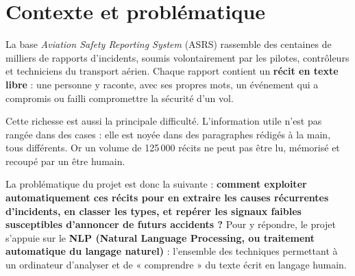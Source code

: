 \documentclass[11pt,a4paper]{article}
\begin{document}
\thispagestyle{empty}
\vspace*{2cm}
\begin{abstract}
\noindent Le présent rapport documente un projet de \textbf{traitement automatique du
langage naturel} appliqué à 125\,763 rapports d'incidents de la base \emph{Aviation Safety
Reporting System} (ASRS) de la NASA. Son objectif est de transformer une grande quantité de
récits écrits en texte libre en informations claires et exploitables pour la sécurité
aérienne. La démarche enchaîne cinq grandes étapes : nettoyer les textes, les convertir en
nombres, les regrouper par thème, identifier les sujets dominants, et enfin prédire le type
d'incident. Chaque choix de méthode est justifié au regard des \emph{caractéristiques
propres au corpus ASRS} (texte libre, vocabulaire abrégé et hétérogène, classes
déséquilibrées, risques émergents). Les résultats — 81 thèmes regroupés en 11 grandes
familles, une classification atteignant un score F1 pondéré de 0,615, et la détection de
risques émergents (drones, brouillage GPS, batteries au lithium) — sont systématiquement
reliés aux enjeux opérationnels de la sécurité aérienne.

\bigskip
\noindent\textbf{Mots-clés :} traitement du langage, sécurité aérienne, ASRS,
regroupement de textes, classification, détection d'anomalies.
\end{abstract}
\newpage

\tableofcontents
\newpage

\section{Contexte et problématique}

La base \emph{Aviation Safety Reporting System} (ASRS) rassemble des centaines de milliers
de rapports d'incidents, soumis volontairement par les pilotes, contrôleurs et techniciens
du transport aérien. Chaque rapport contient un \textbf{récit en texte libre} : une
personne y raconte, avec ses propres mots, un événement qui a compromis ou failli
compromettre la sécurité d'un vol.

Cette richesse est aussi la principale difficulté. L'information utile n'est pas rangée dans
des cases : elle est noyée dans des paragraphes rédigés à la main, tous différents. Or un
volume de 125\,000 récits ne peut pas être lu, mémorisé et recoupé par un être humain.

La problématique du projet est donc la suivante : \textbf{comment exploiter
automatiquement ces récits pour en extraire les causes récurrentes d'incidents, en classer
les types, et repérer les signaux faibles susceptibles d'annoncer de futurs accidents ?}
Pour y répondre, le projet s'appuie sur le \textbf{NLP (Natural Language Processing, ou
traitement automatique du langage naturel)} : l'ensemble des techniques permettant à un
ordinateur d'analyser et de « comprendre » du texte écrit en langage humain.
\end{document}
